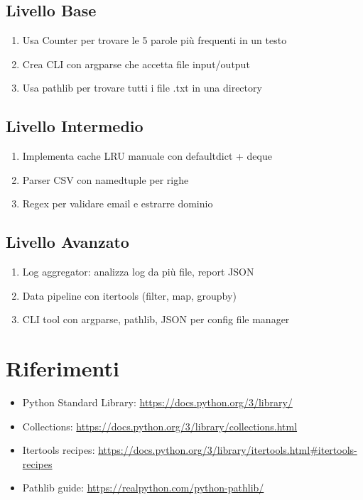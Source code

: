 \subsection{Livello Base}
\begin{enumerate}
  \item Usa Counter per trovare le 5 parole più frequenti in un testo
  \item Crea CLI con argparse che accetta file input/output
  \item Usa pathlib per trovare tutti i file .txt in una directory
\end{enumerate}

\subsection{Livello Intermedio}
\begin{enumerate}
  \item Implementa cache LRU manuale con defaultdict + deque
  \item Parser CSV con namedtuple per righe
  \item Regex per validare email e estrarre dominio
\end{enumerate}

\subsection{Livello Avanzato}
\begin{enumerate}
  \item Log aggregator: analizza log da più file, report JSON
  \item Data pipeline con itertools (filter, map, groupby)
  \item CLI tool con argparse, pathlib, JSON per config file manager
\end{enumerate}

\section{Riferimenti}
\begin{itemize}
  \item Python Standard Library: \url{https://docs.python.org/3/library/}
  \item Collections: \url{https://docs.python.org/3/library/collections.html}
  \item Itertools recipes: \url{https://docs.python.org/3/library/itertools.html#itertools-recipes}
  \item Pathlib guide: \url{https://realpython.com/python-pathlib/}
\end{itemize}
